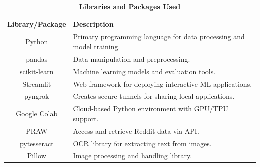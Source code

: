 \begin{table}[h]
    \centering
    \renewcommand{\arraystretch}{1.2}
    \begin{tabular}{|c|p{12cm}|}
        \hline
        \textbf{Library/Package} & \textbf{Description} \\
        \hline
        Python & Primary programming language for data processing and model training. \\
        \hline
        pandas & Data manipulation and preprocessing. \\
        \hline
        scikit-learn & Machine learning models and evaluation tools. \\
        \hline
        Streamlit & Web framework for deploying interactive ML applications. \\
        \hline
        pyngrok & Creates secure tunnels for sharing local applications. \\
        \hline
        Google Colab & Cloud-based Python environment with GPU/TPU support. \\
        \hline
        PRAW & Access and retrieve Reddit data via API. \\
        \hline
        pytesseract & OCR library for extracting text from images. \\
        \hline
        Pillow & Image processing and handling library. \\
        \hline
    \end{tabular}
    \caption*{\textbf{Libraries and Packages Used}}
    \label{tab:libraries}
\end{table}

